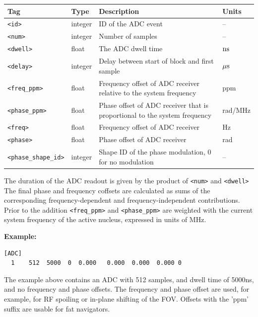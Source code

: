 \documentclass{article}
\begin{document}
\begin{tabularx}{\textwidth}{llXl}
\toprule
Tag & Type & Description & Units\\
\midrule
\verb.<id>. & integer & ID of the ADC event & -- \\
\verb.<num>. & integer & Number of samples & -- \\
\verb.<dwell>. & float & The ADC dwell time & $\rm n s$ \\
\verb.<delay>. & integer & Delay between start of block and first sample & $\rm \mu s$  \\
\verb.<freq_ppm>. & float & Frequency offset of ADC receiver relative to the system frequency & ppm \\
\verb.<phase_ppm>. & float & Phase offset of ADC receiver that is proportional to the system frequency & rad/MHz \\
\verb.<freq>. & float & Frequency offset of ADC receiver & Hz \\
\verb.<phase>. & float & Phase offset of ADC receiver & rad \\
\verb.<phase_shape_id>. & integer & Shape ID of the phase modulation, 0 for no modulation & -- \\
\bottomrule
\end{tabularx}

The duration of the ADC readout is given by the product of \verb.<num>. and \verb.<dwell>. The final phase and frequency coffsets are calculated as sums of the corresponding frequency-dependent and frequency-independent contributions. Prior to the addition \verb.<freq_ppm>. and \verb.<phase_ppm>. are weighted with the current system frequency of the active nucleus, expressed in units of MHz.

\begin{minipage}{\textwidth}
\textbf{Example:}
\begin{lstlisting}
[ADC]
  1    512  5000  0  0.000   0.000  0.000  0.000 0
\end{lstlisting}
\end{minipage}

The example above contains an ADC with 512 samples, and dwell time of 5000ns, and no frequency and phase offsets. The frequency and phase offset are used, for example, for RF spoiling or in-plane shifting of the FOV. Offsets with the 'ppm' suffix are usable for fat navigators.
\end{document}
